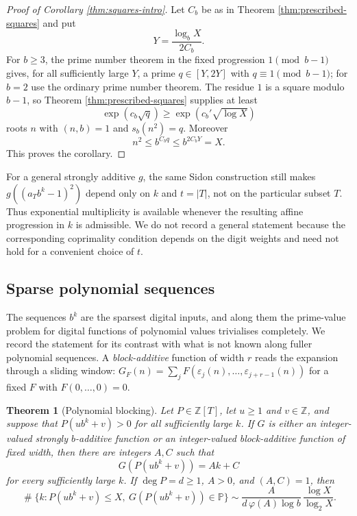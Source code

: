 \documentclass[11pt,reqno]{amsart}
\theoremstyle{plain}
\newtheorem{theorem}{Theorem}[section]
\theoremstyle{definition}
\newcommand{\Z}{\mathbb{Z}}
\newcommand{\Pp}{\mathbb{P}}
\newcommand{\eps}{\varepsilon}
\newcommand{\1}{\mathbf 1}
\DeclareMathOperator{\Card}{\#}
\begin{document}
\begin{proof}[Proof of Corollary \ref{thm:squares-intro}]
Let $C_b$ be as in Theorem \ref{thm:prescribed-squares} and put
\[
 Y=\frac{\log_bX}{2C_b}.
\]
For $b\ge3$, the prime number theorem in the fixed progression $1\pmod{b-1}$ gives, for all sufficiently large $Y$, a prime $q\in[Y,2Y]$ with $q\equiv1\pmod{b-1}$; for $b=2$ use the ordinary prime number theorem.  The residue $1$ is a square modulo $b-1$, so Theorem \ref{thm:prescribed-squares} supplies at least
\[
 \exp(c_b\sqrt q)\ge \exp(c_b'\sqrt{\log X})
\]
roots $n$ with $(n,b)=1$ and $s_b(n^2)=q$.  Moreover
\[
 n^2\le b^{C_bq}\le b^{2C_bY}=X.
\]
This proves the corollary.
\end{proof}

For a general strongly additive $g$, the same Sidon construction still makes $g((a_Tb^k-1)^2)$ depend only on $k$ and $t=|T|$, not on the particular subset $T$.  Thus exponential multiplicity is available whenever the resulting affine progression in $k$ is admissible.  We do not record a general statement because the corresponding coprimality condition depends on the digit weights and need not hold for a convenient choice of $t$.

\subsection{Sparse polynomial sequences}\label{sec:blocking}

The sequences $b^k$ are the sparsest digital inputs, and along them the prime-value problem for digital functions of polynomial values trivialises completely.  We record the statement for its contrast with what is not known along fuller polynomial sequences.  A \emph{block-additive} function of width $r$ reads the expansion through a sliding window: $G_F(n)=\sum_jF(\eps_j(n),\ldots,\eps_{j+r-1}(n))$ for a fixed $F$ with $F(0,\ldots,0)=0$.

\begin{theorem}[Polynomial blocking]\label{thm:polynomial-intro}
Let $P\in\Z[T]$, let $u\ge1$ and $v\in\Z$, and suppose that $P(ub^k+v)>0$ for all sufficiently large $k$.  If $G$ is either an integer-valued strongly $b$-additive function or an integer-valued block-additive function of fixed width, then there are integers $A,C$ such that
\[
 G(P(ub^k+v))=Ak+C
\]
for every sufficiently large $k$.  If $\deg P=d\ge1$, $A>0$, and $(A,C)=1$, then
\[
 \Card\{k:P(ub^k+v)\le X,\ G(P(ub^k+v))\in\Pp\}
 \sim \frac{A}{d\,\varphi(A)\log b}\,\frac{\log X}{\log_2X}.
\]
\end{theorem}
\end{document}
